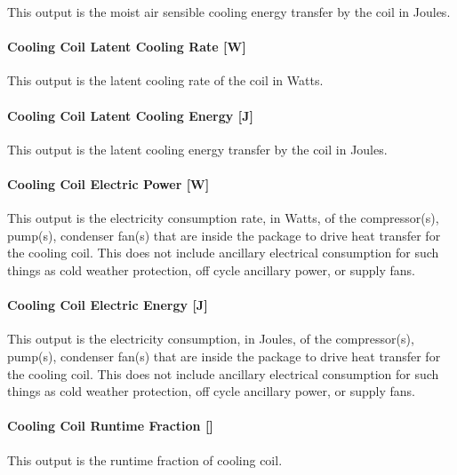 This output is the moist air sensible cooling energy transfer by the coil in Joules.

\paragraph{Cooling Coil Latent Cooling Rate {[}W{]}}\label{cooling-coil-latent-cooling-rate-w-6}

This output is the latent cooling rate of the coil in Watts.

\paragraph{Cooling Coil Latent Cooling Energy {[}J{]}}\label{cooling-coil-latent-cooling-energy-j-8}

This output is the latent cooling energy transfer by the coil in Joules.

\paragraph{Cooling Coil Electric Power {[}W{]}}\label{cooling-coil-electric-power-w-4}

This output is the electricity consumption rate, in Watts, of the compressor(s), pump(s), condenser fan(s) that are inside the package to drive heat transfer for the cooling coil. This does not include ancillary electrical consumption for such things as cold weather protection, off cycle ancillary power, or supply fans.

\paragraph{Cooling Coil Electric Energy {[}J{]}}\label{cooling-coil-electric-energy-j-5}

This output is the electricity consumption, in Joules, of the compressor(s), pump(s), condenser fan(s) that are inside the package to drive heat transfer for the cooling coil. This does not include ancillary electrical consumption for such things as cold weather protection, off cycle ancillary power, or supply fans.

\paragraph{Cooling Coil Runtime Fraction {[]}}\label{cooling-coil-runtime-fraction-8}

This output is the runtime fraction of cooling coil.

